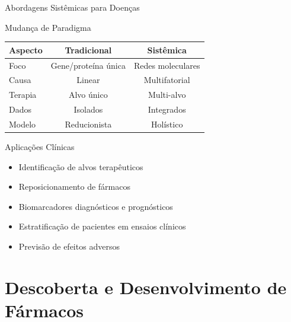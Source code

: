 \begin{frame}{Abordagens Sistêmicas para Doenças}
\begin{block}{Mudança de Paradigma}
\begin{center}
\begin{tabular}{lcc}
\toprule
\textbf{Aspecto} & \textbf{Tradicional} & \textbf{Sistêmica} \\
\midrule
Foco & Gene/proteína única & Redes moleculares \\
Causa & Linear & Multifatorial \\
Terapia & Alvo único & Multi-alvo \\
Dados & Isolados & Integrados \\
Modelo & Reducionista & Holístico \\
\bottomrule
\end{tabular}
\end{center}
\end{block}

\vspace{0.3cm}

\begin{exampleblock}{Aplicações Clínicas}
\begin{itemize}
    \item Identificação de alvos terapêuticos
    \item Reposicionamento de fármacos
    \item Biomarcadores diagnósticos e prognósticos
    \item Estratificação de pacientes em ensaios clínicos
    \item Previsão de efeitos adversos
\end{itemize}
\end{exampleblock}
\end{frame}

\section{Descoberta e Desenvolvimento de Fármacos}

